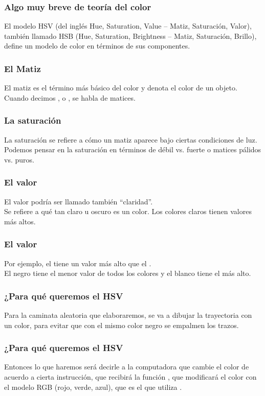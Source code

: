 \documentclass[12pt]{beamer}
\begin{document}
\begin{frame}
\frametitle{Algo muy breve de teoría del color}
El modelo HSV (del inglés Hue, Saturation, Value – Matiz, Saturación, Valor), \pause también llamado HSB (Hue, Saturation, Brightness – Matiz, Saturación, Brillo), \pause define un modelo de color en términos de sus componentes.
\end{frame}
\begin{frame}
\frametitle{El Matiz}
El matiz es el término más básico del color y denota el color de un objeto.
\\
\bigskip
\pause
Cuando decimos ,  o , se habla de matices.
\end{frame}
\begin{frame}
\frametitle{La saturación}
La saturación se refiere a cómo un matiz aparece bajo ciertas condiciones de luz.
\\
\bigskip
\pause
Podemos pensar en la saturación en términos de débil vs. fuerte o matices pálidos vs. puros.     
\end{frame}
\begin{frame}
\frametitle{El valor}
El valor podría ser llamado también \enquote{claridad}.
\\
\bigskip
\pause
Se refiere a qué tan claro u oscuro es un color. Los colores claros tienen valores más altos.
\end{frame}
\begin{frame}
\frametitle{El valor}
Por ejemplo, el  tiene un valor más alto que el . 
\\
\bigskip
\pause
El negro tiene el menor valor de todos los colores y el blanco tiene el más alto.
\end{frame}
\begin{frame}
\frametitle{¿Para qué queremos el HSV}
Para la caminata aleatoria que elaboraremos, se va a dibujar la trayectoria con un color, para evitar que con el mismo color negro se empalmen los trazos.
\end{frame}
\begin{frame}
\frametitle{¿Para qué queremos el HSV}
Entonces lo que haremos será decirle a la computadora que cambie el color de acuerdo a cierta instrucción, que recibirá la función , que modificará el color con el modelo RGB (rojo, verde, azul), que es el que utiliza \python{}.
\end{frame}
\end{document}
